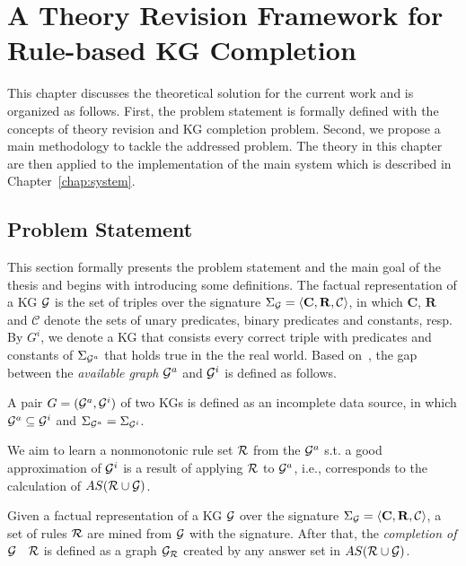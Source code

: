 \chapter{A Theory Revision Framework for Rule-based KG Completion}
\label{chap:frame}

This chapter discusses the theoretical solution for the current work and is organized as follows. First, the problem statement is formally defined with the concepts of theory revision and KG completion problem. Second, we propose a main methodology to tackle the addressed problem. The theory in this chapter are then applied to the implementation of the main system which is described in Chapter~\ref{chap:system}.

\section{Problem Statement}

This section formally presents the problem statement and the main goal of the thesis and begins with introducing some definitions. The factual representation of a KG $\mathcal{G}$ is the set of triples over the signature $\Sigma_{\mathcal{G}}=\langle\mathbf{C},\mathbf{R},\mathcal{C}\rangle$, in which $\mathbf{C}$, $\mathbf{R}$ and $\mathcal{C}$ denote the sets of unary predicates, binary predicates and constants, resp. By $G^i$, we denote a KG that consists every correct triple with predicates and constants of $\Sigma_{\mathcal{G}^a}$ that holds true in the the real world. Based on~\cite{ref51}, the gap between the \emph{available graph} $\mathcal{G}^a$ and $\mathcal{G}^i$ is defined as follows.

\begin{definition} A pair $G = (\mathcal{G}^a, \mathcal{G}^i)$ of two KGs is defined as an incomplete data source, in which $\mathcal{G}^a\subseteq \mathcal{G}^i$ and $\Sigma_{\mathcal{G}^a}=\Sigma_{\mathcal{G}^i}$.
\end{definition}

We aim to learn a nonmonotonic rule set $\mathcal{R}$ from the $\mathcal{G}^a$ s.t. a good approximation of $\mathcal{G}^i$ is a result of applying $\mathcal{R}$ to $\mathcal{G}^a$, i.e., corresponds to the calculation of $AS(\mathcal{R} \cup \mathcal{G})$.

\begin{definition}\label{def:graphcompl}
Given a factual representation of a KG $\mathcal{G}$ over the signature $\Sigma_{\mathcal{G}}=\langle\mathbf{C},\mathbf{R},\mathcal{C}\rangle$, a set of rules $\mathcal{R}$ are mined from $\mathcal{G}$ with the signature. After that, the \emph{completion of $\mathcal{G}$ \wrt\ $\mathcal{R}$} is defined as a graph $\mathcal{G}_{\mathcal{R}}$ created by any answer set in $AS(\mathcal{R} \cup \mathcal{G})$.
\end{definition}

